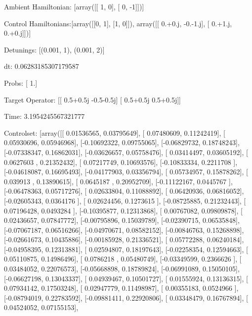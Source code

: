 \documentclass{article}
\begin{document}
    

\newpage

Ambient Hamiltonian: [array([[ 1,  0],
       [ 0, -1]])]

Control Hamiltonians:[array([[0, 1],
       [1, 0]]), array([[ 0.+0.j, -0.-1.j],
       [ 0.+1.j,  0.+0.j]])]

Detunings: [(0.001, 1), (0.001, 2)]

 dt: 0.06283185307179587

Probs: [ 1.]

Target Operator: [[ 0.5+0.5j -0.5-0.5j]
 [ 0.5+0.5j  0.5+0.5j]]

Time: 3.1954245567321777

Controlset: [array([[ 0.01536565,  0.03795649],
       [ 0.07480609,  0.11242419],
       [ 0.05930696,  0.05946968],
       [-0.10692322,  0.09755065],
       [-0.06829732,  0.18748243],
       [-0.07338347,  0.16862031],
       [-0.03626657,  0.05758476],
       [ 0.03414497,  0.03605192],
       [ 0.0627603 ,  0.21352432],
       [ 0.07217749,  0.10693576],
       [-0.10833334,  0.2211708 ],
       [-0.04618087,  0.16695493],
       [-0.04177903,  0.03356794],
       [ 0.05734957,  0.15878262],
       [ 0.039913  ,  0.13890615],
       [ 0.0645187 ,  0.20952709],
       [-0.11122167,  0.0445767 ],
       [-0.06478363,  0.05717276],
       [ 0.02633804,  0.11088892],
       [ 0.06420936,  0.06816052],
       [-0.02605343,  0.0364176 ],
       [ 0.02624456,  0.1273615 ],
       [-0.08725885,  0.21232443],
       [ 0.07196428,  0.0493284 ],
       [-0.10395877,  0.12313868],
       [ 0.00767082,  0.09809878],
       [ 0.02436657,  0.07847772],
       [-0.00795896,  0.15039789],
       [-0.02390715,  0.06535848],
       [-0.07067187,  0.06516266],
       [-0.04970671,  0.08582152],
       [-0.00846763,  0.15268898],
       [-0.02661673,  0.10435886],
       [-0.00185928,  0.21336521],
       [ 0.05772288,  0.06240184],
       [-0.04958395,  0.12313881],
       [ 0.02594807,  0.18197643],
       [-0.02258354,  0.12594663],
       [ 0.05110875,  0.14986496],
       [ 0.0786218 ,  0.05480749],
       [-0.03349599,  0.2366626 ],
       [ 0.03484052,  0.22076573],
       [-0.05668898,  0.18789824],
       [-0.06991089,  0.15050105],
       [-0.06627198,  0.13043337],
       [ 0.04939467,  0.10501727],
       [ 0.01555924,  0.13136315],
       [ 0.07934142,  0.17503248],
       [ 0.02947779,  0.11498987],
       [ 0.00355183,  0.0524966 ],
       [-0.08794019,  0.22783592],
       [-0.09881411,  0.22920806],
       [ 0.03348479,  0.16767894],
       [ 0.04524052,  0.07155153],
\end{document}
